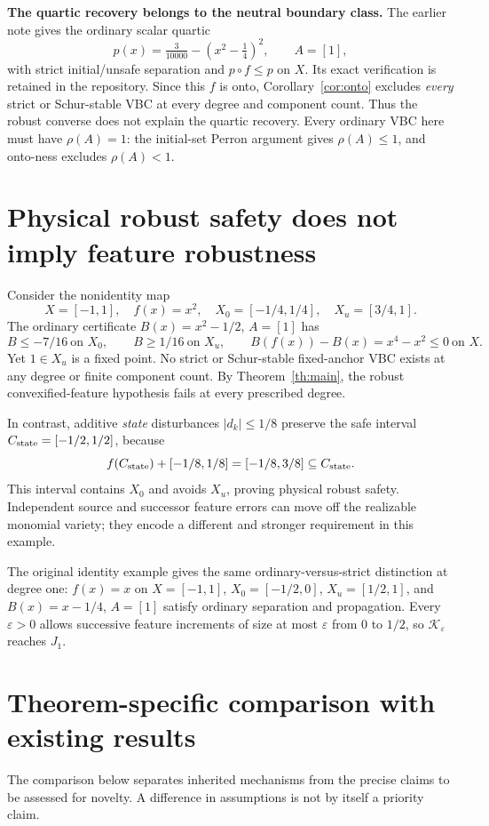 \documentclass[10pt,letterpaper]{article}
\theoremstyle{remark}
\begin{document}
\textbf{The quartic recovery belongs to the neutral boundary class.}
The earlier note gives the ordinary scalar quartic
\[
 p(x)=\tfrac3{10000}-(x^2-\tfrac14)^2,\qquad A=[1],
\]
with strict initial/unsafe separation and $p\circ f\leq p$ on $X$. Its exact verification is retained in the repository. Since this $f$ is onto, Corollary~\ref{cor:onto} excludes \emph{every} strict or Schur-stable VBC at every degree and component count. Thus the robust converse does not explain the quartic recovery. Every ordinary VBC here must have $\rho(A)=1$: the initial-set Perron argument gives $\rho(A)\leq1$, and onto-ness excludes $\rho(A)<1$.

\section{Physical robust safety does not imply feature robustness}\label{sec:physical}
Consider the nonidentity map
\[
 X=[-1,1],\quad f(x)=x^2,\quad
 X_0=[-1/4,1/4],\quad X_u=[3/4,1].
\]
The ordinary certificate $B(x)=x^2-1/2$, $A=[1]$ has
\[
 B\leq-7/16\ \text{on }X_0,\qquad B\geq1/16\ \text{on }X_u,\qquad
 B(f(x))-B(x)=x^4-x^2\leq0\ \text{on }X.
\]
Yet $1\in X_u$ is a fixed point. No strict or Schur-stable fixed-anchor VBC exists at any degree or finite component count. By Theorem~\ref{th:main}, the robust convexified-feature hypothesis fails at every prescribed degree.

In contrast, additive \emph{state} disturbances $|d_k|\leq1/8$ preserve the safe interval $C_{\rm state}=[-1/2,1/2]$, because
\[
 f(C_{\rm state})+[-1/8,1/8]=[-1/8,3/8]\subseteq C_{\rm state}.
\]
This interval contains $X_0$ and avoids $X_u$, proving physical robust safety. Independent source and successor feature errors can move off the realizable monomial variety; they encode a different and stronger requirement in this example.

The original identity example gives the same ordinary-versus-strict distinction at degree one: $f(x)=x$ on $X=[-1,1]$, $X_0=[-1/2,0]$, $X_u=[1/2,1]$, and $B(x)=x-1/4$, $A=[1]$ satisfy ordinary separation and propagation. Every $\varepsilon>0$ allows successive feature increments of size at most $\varepsilon$ from $0$ to $1/2$, so $\mathcal K_\varepsilon$ reaches $J_1$.

\section{Theorem-specific comparison with existing results}\label{sec:literature}
The comparison below separates inherited mechanisms from the precise claims
to be assessed for novelty. A difference in assumptions is not by itself a priority claim.
\end{document}
